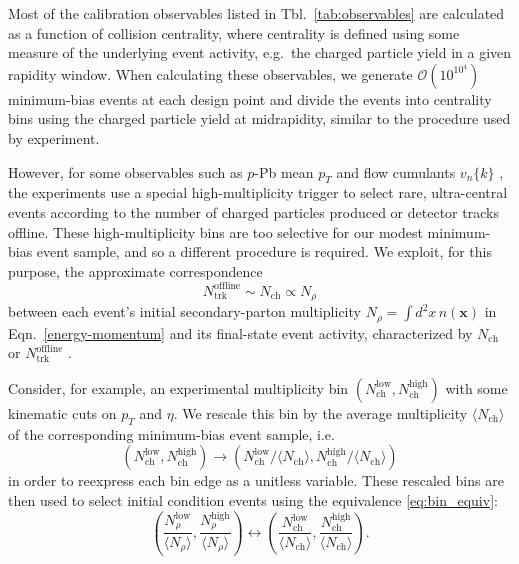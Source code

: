 \documentclass[aps,prc,reprint,amsmath,nofootinbib]{revtex4-1}
\newcommand{\nch}{N_\text{ch}}
\newcommand{\ntrk}{N_\text{trk}^\text{offline}}
\newcommand{\x}{\mathbf{x}}
\newcommand{\vnk}[2]{v_#1\{#2\}}
\newcommand{\order}[1]{$\mathcal O(10^{#1})$}
\begin{document}
Most of the calibration observables listed in Tbl.~\ref{tab:observables} are calculated as a function of collision centrality, where centrality is defined using some measure of the underlying event activity, e.g.\ the charged particle yield in a given rapidity window.
When calculating these observables, we generate \order{10^4} minimum-bias events at each design point and divide the events into centrality bins using the charged particle yield at midrapidity, similar to the procedure used by experiment.

However, for some observables such as $p$-Pb mean $p_T$ \cite{Abelev:2013bla} and flow cumulants $\vnk{n}{k}$ \cite{Chatrchyan:2013nka}, the experiments use a special high-multiplicity trigger to select rare, ultra-central events according to the number of charged particles produced or detector tracks offline.
These high-multiplicity bins are too selective for our modest minimum-bias event sample, and so a different procedure is required.
We exploit, for this purpose, the approximate correspondence
\begin{equation}
  \label{eq:bin_equiv}
  \ntrk \sim \nch \propto N_\rho
\end{equation}
between each event's initial secondary-parton multiplicity ${N_\rho = \int d^2x\,n(\x)}$ in Eqn.~\eqref{energy-momentum} and its final-state event activity, characterized by $\nch$ or $\ntrk$ \cite{Abelev:2013bla, Chatrchyan:2013nka}.

Consider, for example, an experimental multiplicity bin $(\nch^\text{low}, \nch^\text{high})$ with some kinematic cuts on $p_T$ and $\eta$.
We rescale this bin by the average multiplicity $\langle \nch \rangle$ of the corresponding minimum-bias event sample, i.e.\
\begin{equation}
  (\nch^\text{low}, \nch^\text{high}) \rightarrow (\nch^\text{low} / \langle \nch \rangle, \nch^\text{high} / \langle \nch \rangle)
\end{equation}
in order to reexpress each bin edge as a unitless variable.
These rescaled bins are then used to select initial condition events using the equivalence \eqref{eq:bin_equiv}:
\begin{equation}
  \label{eq:mult_trigger}
  \left (\frac{N^\text{low}_\rho}{\langle N_\rho \rangle}, \frac{N^\text{high}_\rho}{\langle N_\rho \rangle} \right) \leftrightarrow \left (\frac{\nch^\text{low}}{\langle \nch \rangle}, \frac{\nch^\text{high}}{\langle \nch \rangle} \right ).
\end{equation}
\end{document}
